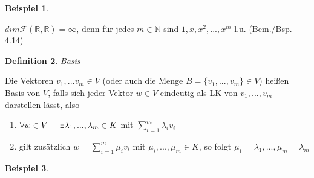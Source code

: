 \documentclass[a4paper,11pt]{article}
\newtheorem{definition}{Definition}[section]
\newtheorem{bsp}[definition]{Beispiel}
\begin{document}
\begin{bsp}
\end{bsp}
$dim\mathscr{F}(\mathbb{R},\mathbb{R})=\infty$, denn für jedes $m\in\mathbb{N}$ sind $1,x,x^2,...,x^m$ l.u. (Bem./Bsp. 4.14)
\begin{definition}
Basis
\end{definition}
Die Vektoren $v_1,...v_m\in V$ (oder auch die Menge $B=\{v_1,...,v_m\}\in V$) heißen Basis von $V$, falls sich jeder Vektor $w\in V$ eindeutig als LK von $v_1,...,v_m$ darstellen lässt, also
\begin{enumerate}[label=(\arabic*)]
\item $\forall w\in V\hspace{5mm}\exists\lambda_1,...,\lambda_m\in K$ mit $\sum^m_{i=1}\lambda_iv_i$
\item gilt zusätzlich $w=\sum^m_{i=1}\mu_iv_i$ mit $\mu_i,...,\mu_m\in K$, so folgt $\mu_1=\lambda_1,...,\mu_m=\lambda_m$
\end{enumerate}
\newpage
\begin{bsp}
\end{bsp}
\end{document}
